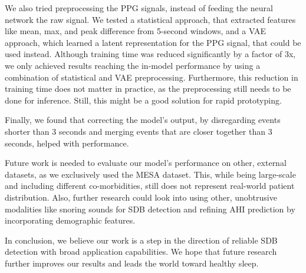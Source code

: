 We also tried preprocessing the PPG signals, instead of feeding the neural network the raw signal. We tested a statistical approach, that extracted features like mean, max, and peak difference from 5-second windows, and a VAE approach, which learned a latent representation for the PPG signal, that could be used instead. Although training time was reduced significantly by a factor of 3x, we only achieved results reaching the in-model performance by using a combination of statistical and VAE preprocessing. Furthermore, this reduction in training time does not matter in practice, as the preprocessing still needs to be done for inference. Still, this might be a good solution for rapid prototyping.

Finally, we found that correcting the model's output, by disregarding events shorter than 3 seconds and merging events that are closer together than 3 seconds, helped with performance.

Future work is needed to evaluate our model's performance on other, external datasets, as we exclusively used the MESA dataset. This, while being large-scale and including different co-morbidities, still does not represent real-world patient distribution.
Also, further research could look into using other, unobtrusive modalities like snoring sounds for SDB detection and refining AHI prediction by incorporating demographic features.

In conclusion, we believe our work is a step in the direction of reliable SDB detection with broad application capabilities. We hope that future research further improves our results and leads the world toward healthy sleep.